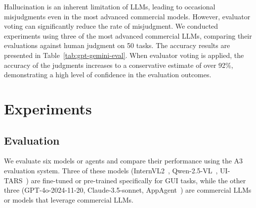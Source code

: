 \documentclass[11pt]{article}
\begin{document}
Hallucination is an inherent limitation of LLMs, leading to occasional misjudgments even in the most advanced commercial models. However, evaluator voting can significantly reduce the rate of misjudgment. We conducted experiments using three of the most advanced commercial LLMs, comparing their evaluations against human judgment on 50 tasks. The accuracy results are presented in Table~\ref{tab:gpt-gemini-eval}. When evaluator voting is applied, the accuracy of the judgments increases to a conservative estimate of over 92\%, demonstrating a high level of confidence in the evaluation outcomes.


\section{Experiments}









\subsection{Evaluation}

We evaluate six models or agents and compare their performance using the A3 evaluation system. Three of these models (InternVL2~\citep{chen2024internvl}, Qwen-2.5-VL~\citep{Qwen2.5-VL}, UI-TARS~\citep{qin2025ui-tars}) are fine-tuned or pre-trained specifically for GUI tasks, while the other three (GPT-4o-2024-11-20, Claude-3.5-sonnet, AppAgent~\citep{yang2023appagent}) are commercial LLMs or models that leverage commercial LLMs.
\end{document}
